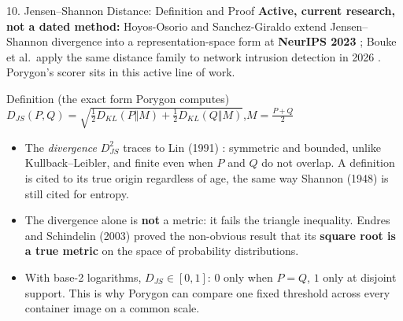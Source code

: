 \documentclass[aspectratio=169, 11pt]{beamer}
\newcommand{\hl}[1]{\textcolor{keyRed}{\textbf{#1}}}
\begin{document}
\begin{frame}{10. Jensen--Shannon Distance: Definition and Proof}
    \footnotesize
    \textbf{Active, current research, not a dated method:} Hoyos-Osorio and Sanchez-Giraldo extend Jensen--Shannon divergence into a representation-space form at \hl{NeurIPS 2023} \cite{hoyos2023}; Bouke et al.\ apply the same distance family to network intrusion detection in 2026 \cite{bouke2026}. Porygon's scorer sits in this active line of work.
    \vspace{0.08cm}
    \begin{block}{Definition (the exact form Porygon computes)}
        \centering
        $D_{JS}(P,Q)=\sqrt{\tfrac{1}{2}D_{KL}(P\Vert M)+\tfrac{1}{2}D_{KL}(Q\Vert M)}$,\quad $M=\tfrac{P+Q}{2}$
    \end{block}
    \vspace{0.08cm}
    \begin{itemize}\setlength\itemsep{2pt}
        \item The \emph{divergence} $D_{JS}^2$ traces to Lin (1991) \cite{lin1991}: symmetric and bounded, unlike Kullback--Leibler, and finite even when $P$ and $Q$ do not overlap. A definition is cited to its true origin regardless of age, the same way Shannon (1948) is still cited for entropy.
        \item The divergence alone is \textbf{not} a metric: it fails the triangle inequality. Endres and Schindelin (2003) \cite{endres2003} proved the non-obvious result that its \hl{square root is a true metric} on the space of probability distributions.
        \item With base-2 logarithms, $D_{JS}\in[0,1]$: $0$ only when $P=Q$, $1$ only at disjoint support. This is why Porygon can compare one fixed threshold across every container image on a common scale.
    \end{itemize}
\end{frame}
\end{document}
